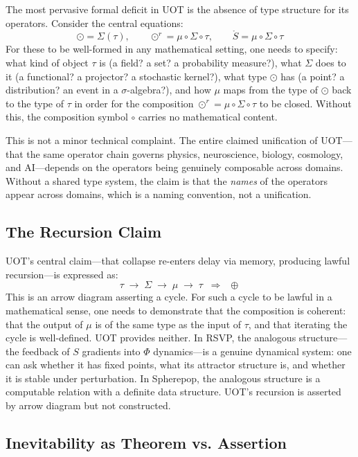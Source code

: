 \documentclass[12pt, oneside]{article}
\theoremstyle{plain-remark}
\newcommand{\utau}{\tau}
\newcommand{\uSigma}{\Sigma}
\newcommand{\umu}{\mu}
\newcommand{\ucollapse}{\odot}
\newcommand{\urcollapse}{\odot^r}
\newcommand{\uunion}{\oplus}
\newcommand{\uS}{\mathring{S}}
\newcommand{\Phif}{\Phi}
\newcommand{\Sf}{S}
\begin{document}
The most pervasive formal deficit in UOT is the absence of type structure for its
operators. Consider the central equations:
\[
\ucollapse = \uSigma(\utau), \qquad \urcollapse = \umu \circ \uSigma \circ \utau,
\qquad \uS = \umu \circ \uSigma \circ \utau
\]
For these to be well-formed in any mathematical setting, one needs to specify: what kind
of object $\utau$ is (a field? a set? a probability measure?), what $\uSigma$ does to it
(a functional? a projector? a stochastic kernel?), what type $\ucollapse$ has (a point?
a distribution? an event in a $\sigma$-algebra?), and how $\umu$ maps from the type of
$\ucollapse$ back to the type of $\utau$ in order for the composition $\urcollapse =
\umu \circ \uSigma \circ \utau$ to be closed. Without this, the composition symbol $\circ$
carries no mathematical content.

This is not a minor technical complaint. The entire claimed unification of UOT---that the
same operator chain governs physics, neuroscience, biology, cosmology, and AI---depends on
the operators being genuinely composable across domains. Without a shared type system, the
claim is that the \emph{names} of the operators appear across domains, which is a naming
convention, not a unification.

\subsection{The Recursion Claim}

UOT's central claim---that collapse re-enters delay via memory, producing lawful
recursion---is expressed as:
\[
\utau \;\to\; \uSigma \;\to\; \umu \;\to\; \utau \;\;\Rightarrow\;\; \uunion
\]
This is an arrow diagram asserting a cycle. For such a cycle to be lawful in a mathematical
sense, one needs to demonstrate that the composition is coherent: that the output of $\umu$
is of the same type as the input of $\utau$, and that iterating the cycle is well-defined.
UOT provides neither. In RSVP, the analogous structure---the feedback of $\Sf$ gradients
into $\Phif$ dynamics---is a genuine dynamical system: one can ask whether it has fixed
points, what its attractor structure is, and whether it is stable under perturbation.
In Spherepop, the analogous structure is a computable relation with a definite data
structure. UOT's recursion is asserted by arrow diagram but not constructed.

\subsection{Inevitability as Theorem vs. Assertion}
\end{document}
